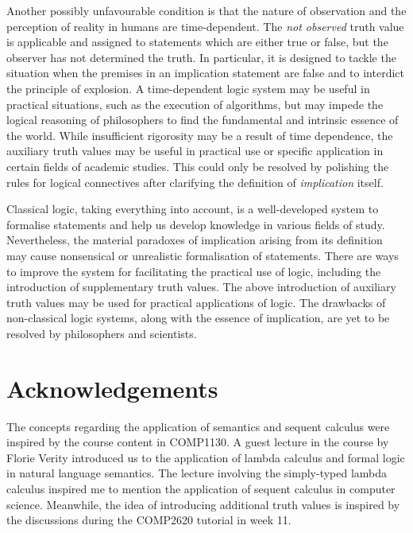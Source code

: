 \documentclass{article}
\begin{document}
Another possibly unfavourable condition is that the nature of observation and the perception of reality in humans are time-dependent. The \textit{not observed} truth value is applicable and assigned to statements which are either true or false, but the observer has not determined the truth. In particular, it is designed to tackle the situation when the premises in an implication statement are false and to interdict the principle of explosion. A time-dependent logic system may be useful in practical situations, such as the execution of algorithms, but may impede the logical reasoning of philosophers to find the fundamental and intrinsic essence of the world. While insufficient rigorosity may be a result of time dependence, the auxiliary truth values may be useful in practical use or specific application in certain fields of academic studies. This could only be resolved by polishing the rules for logical connectives after clarifying the definition of \textit{implication} itself.

\bigskip

Classical logic, taking everything into account, is a well-developed system to formalise statements and help us develop knowledge in various fields of study. Nevertheless, the material paradoxes of implication arising from its definition may cause nonsensical or unrealistic formalisation of statements. There are ways to improve the system for facilitating the practical use of logic, including the introduction of supplementary truth values. The above introduction of auxiliary truth values may be used for practical applications of logic. The drawbacks of non-classical logic systems, along with the essence of implication, are yet to be resolved by philosophers and scientists.

\newpage

\section*{Acknowledgements}

The concepts regarding the application of semantics and sequent calculus were inspired by the course content in COMP1130. A guest lecture in the course by Florie Verity introduced us to the application of lambda calculus and formal logic in natural language semantics. The lecture involving the simply-typed lambda calculus inspired me to mention the application of sequent calculus in computer science. Meanwhile, the idea of introducing additional truth values is inspired by the discussions during the COMP2620 tutorial in week 11.



\end{document}
